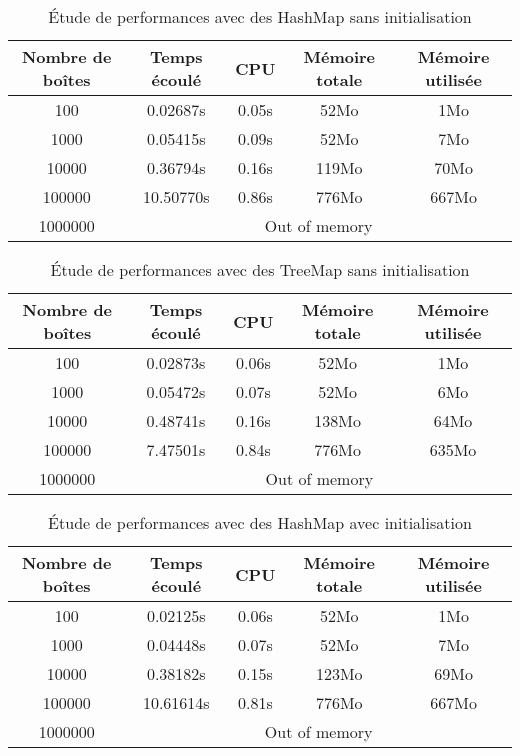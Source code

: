 \begin{table}[htpb]
\label{tab:hashmap1}
  \centering
\begin{tabular}{|c|c|c|c|c|}
\hline
Nombre de boîtes & Temps écoulé & CPU & Mémoire totale & Mémoire utilisée\\
\hline
100 & 0.02687s & 0.05s & 52Mo & 1Mo\\
\hline
1000 & 0.05415s & 0.09s & 52Mo & 7Mo\\
\hline
10000 & 0.36794s & 0.16s & 119Mo & 70Mo\\
\hline
100000 & 10.50770s & 0.86s & 776Mo & 667Mo\\
\hline
1000000 & \multicolumn{4}{|c|}{Out of memory}\\
\hline
\end{tabular}
\caption{Étude de performances avec des HashMap sans initialisation}
\end{table}

\begin{table}[htbp]
  \centering
\begin{tabular}{|c|c|c|c|c|}
\hline
Nombre de boîtes & Temps écoulé & CPU & Mémoire totale & Mémoire utilisée\\
\hline
100 & 0.02873s & 0.06s & 52Mo & 1Mo\\
\hline
1000 & 0.05472s & 0.07s & 52Mo & 6Mo\\
\hline
10000 & 0.48741s & 0.16s & 138Mo & 64Mo\\
\hline
100000 & 7.47501s & 0.84s & 776Mo & 635Mo\\
\hline
1000000 & \multicolumn{4}{|c|}{Out of memory}\\
\hline
\end{tabular}
\caption{Étude de performances avec des TreeMap sans initialisation}
\end{table}

\begin{table}[htbp]
  \centering
\begin{tabular}{|c|c|c|c|c|}
\hline
Nombre de boîtes & Temps écoulé & CPU & Mémoire totale & Mémoire utilisée\\
\hline
100 & 0.02125s & 0.06s & 52Mo & 1Mo\\
\hline
1000 & 0.04448s & 0.07s & 52Mo & 7Mo\\
\hline
10000 & 0.38182s & 0.15s & 123Mo & 69Mo\\
\hline
100000 & 10.61614s & 0.81s & 776Mo & 667Mo\\
\hline
1000000 & \multicolumn{4}{|c|}{Out of memory}\\
\hline
\end{tabular}
\caption{Étude de performances avec des HashMap avec initialisation}
\end{table}

